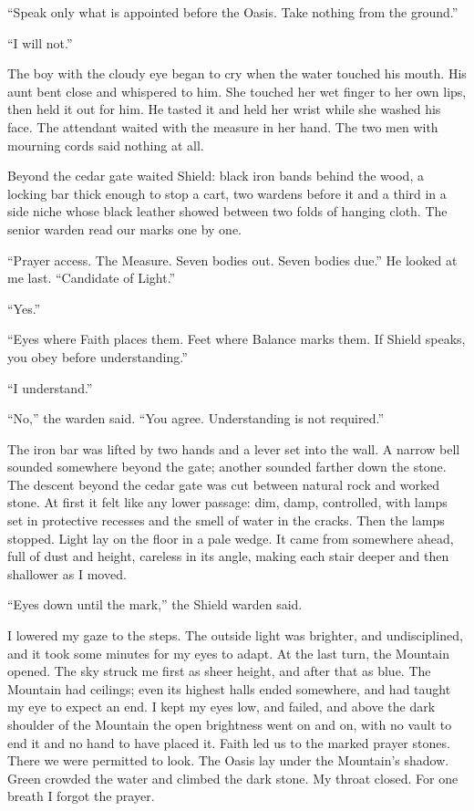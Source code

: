 ``Speak only what is appointed before the Oasis. Take nothing from the ground.''\par
``I will not.''\par

The boy with the cloudy eye began to cry when the water touched his mouth. His aunt bent close and whispered to him. She touched her wet finger to her own lips, then held it out for him. He tasted it and held her wrist while she washed his face. The attendant waited with the measure in her hand. The two men with mourning cords said nothing at all.\par

\ornament

Beyond the cedar gate waited Shield: black iron bands behind the wood, a locking bar thick enough to stop a cart, two wardens before it and a third in a side niche whose black leather showed between two folds of hanging cloth. The senior warden read our marks one by one.\par

``Prayer access. The Measure. Seven bodies out. Seven bodies due.'' He looked at me last. ``Candidate of Light.''\par
``Yes.''\par
``Eyes where Faith places them. Feet where Balance marks them. If Shield speaks, you obey before understanding.''\par
``I understand.''\par
``No,'' the warden said. ``You agree. Understanding is not required.''\par

The iron bar was lifted by two hands and a lever set into the wall. A narrow bell sounded somewhere beyond the gate; another sounded farther down the stone. The descent beyond the cedar gate was cut between natural rock and worked stone. At first it felt like any lower passage: dim, damp, controlled, with lamps set in protective recesses and the smell of water in the cracks. Then the lamps stopped. Light lay on the floor in a pale wedge. It came from somewhere ahead, full of dust and height, careless in its angle, making each stair deeper and then shallower as I moved.\par

``Eyes down until the mark,'' the Shield warden said.\par

I lowered my gaze to the steps. The outside light was brighter, and undisciplined, and it took some minutes for my eyes to adapt. At the last turn, the Mountain opened. The sky struck me first as sheer height, and after that as blue. The Mountain had ceilings; even its highest halls ended somewhere, and had taught my eye to expect an end. I kept my eyes low, and failed, and above the dark shoulder of the Mountain the open brightness went on and on, with no vault to end it and no hand to have placed it. Faith led us to the marked prayer stones. There we were permitted to look. The Oasis lay under the Mountain's shadow. Green crowded the water and climbed the dark stone. My throat closed. For one breath I forgot the prayer.

